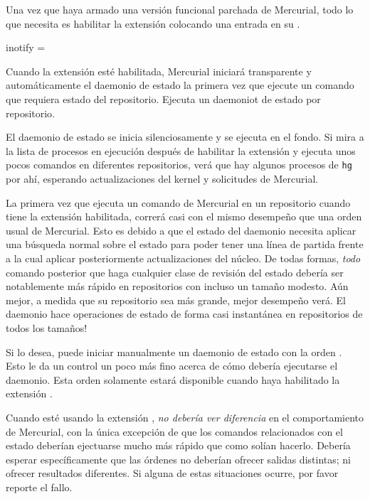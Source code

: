 Una vez que haya armado una versión funcional parchada de Mercurial,
todo lo que necesita es habilitar la extensión 
colocando una entrada en su \hgrc.
\begin{codesample2}
  [extensions]
  inotify =
\end{codesample2}
Cuando la extensión  esté habilitada, Mercurial
iniciará transparente y automáticamente el daemonio de estado la
primera vez que ejecute un comando que requiera estado del
repositorio.  Ejecuta un daemoniot de estado por repositorio.

El daemonio de estado se inicia silenciosamente y se ejecuta en el
fondo. Si mira a la lista de procesos en ejecución después de
habilitar la extensión  y ejecuta unos pocos comandos
en diferentes repositorios, verá que hay algunos procesos de
\texttt{hg} por ahí, esperando actualizaciones del kernel y
solicitudes de Mercurial.

La primera vez que ejecuta un comando de Mercurial en un repositorio
cuando tiene la extensión  habilitada, correrá casi con
el mismo desempeño que una orden usual de Mercurial.  Esto es debido a
que el estado del daemonio necesita aplicar una búsqueda normal sobre
el estado para poder tener una línea de partida frente a la cual
aplicar posteriormente actualizaciones del núcleo.  De todas formas,
\emph{todo} comando posterior que haga cualquier clase de revisión del
estado debería ser notablemente más rápido en repositorios con incluso
un tamaño modesto.  Aún mejor, a medida que su repositorio sea más
grande, mejor desempeño verá.  El daemonio  hace
operaciones de estado de forma casi instantánea en repositorios de
todos los tamaños!

Si lo desea, puede iniciar manualmente un daemonio de estado con la orden
.  Esto le da un control un poco más fino
acerca de cómo debería ejecutarse el daemonio.  Esta orden solamente
estará disponible cuando haya habilitado la extensión .

Cuando esté usando la extensión ,
\emph{no debería ver diferencia} en el comportamiento de Mercurial,
con la única excepción de que los comandos relacionados con el estado
deberían ejectuarse mucho más rápido que como solían hacerlo.  Debería
esperar específicamente que las órdenes no deberían ofrecer salidas
distintas; ni ofrecer resultados diferentes.  Si alguna de estas
situaciones ocurre, por favor reporte el fallo.

